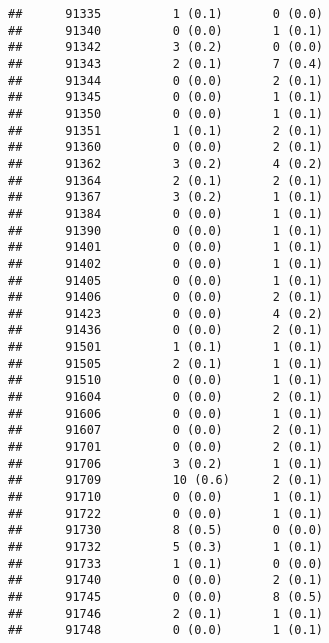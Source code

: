 \documentclass[]{article}
\begin{document}
\begin{verbatim}
##      91335          1 (0.1)       0 (0.0)                        
##      91340          0 (0.0)       1 (0.1)                        
##      91342          3 (0.2)       0 (0.0)                        
##      91343          2 (0.1)       7 (0.4)                        
##      91344          0 (0.0)       2 (0.1)                        
##      91345          0 (0.0)       1 (0.1)                        
##      91350          0 (0.0)       1 (0.1)                        
##      91351          1 (0.1)       2 (0.1)                        
##      91360          0 (0.0)       2 (0.1)                        
##      91362          3 (0.2)       4 (0.2)                        
##      91364          2 (0.1)       2 (0.1)                        
##      91367          3 (0.2)       1 (0.1)                        
##      91384          0 (0.0)       1 (0.1)                        
##      91390          0 (0.0)       1 (0.1)                        
##      91401          0 (0.0)       1 (0.1)                        
##      91402          0 (0.0)       1 (0.1)                        
##      91405          0 (0.0)       1 (0.1)                        
##      91406          0 (0.0)       2 (0.1)                        
##      91423          0 (0.0)       4 (0.2)                        
##      91436          0 (0.0)       2 (0.1)                        
##      91501          1 (0.1)       1 (0.1)                        
##      91505          2 (0.1)       1 (0.1)                        
##      91510          0 (0.0)       1 (0.1)                        
##      91604          0 (0.0)       2 (0.1)                        
##      91606          0 (0.0)       1 (0.1)                        
##      91607          0 (0.0)       2 (0.1)                        
##      91701          0 (0.0)       2 (0.1)                        
##      91706          3 (0.2)       1 (0.1)                        
##      91709          10 (0.6)      2 (0.1)                        
##      91710          0 (0.0)       1 (0.1)                        
##      91722          0 (0.0)       1 (0.1)                        
##      91730          8 (0.5)       0 (0.0)                        
##      91732          5 (0.3)       1 (0.1)                        
##      91733          1 (0.1)       0 (0.0)                        
##      91740          0 (0.0)       2 (0.1)                        
##      91745          0 (0.0)       8 (0.5)                        
##      91746          2 (0.1)       1 (0.1)                        
##      91748          0 (0.0)       1 (0.1)                        

\end{verbatim}
\end{document}
